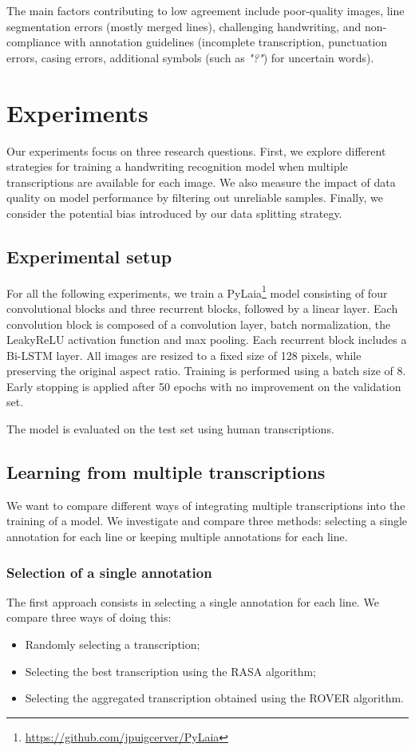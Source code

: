 \documentclass[sigconf]{acmart}
\begin{document}
The main factors contributing to low agreement include poor-quality images, line segmentation errors (mostly merged lines), challenging handwriting, and non-compliance with annotation guidelines (incomplete transcription, punctuation errors, casing errors, additional symbols (such as \textit{"?"}) for uncertain words).  

\section{Experiments}
\label{sec:experiments}

Our experiments focus on three research questions. 
First, we explore different strategies for training a handwriting recognition model when multiple transcriptions are available for each image.
We also measure the impact of data quality on model performance by filtering out unreliable samples. 
Finally, we consider the potential bias introduced by our data splitting strategy. 

\subsection{Experimental setup}

For all the following experiments, we train a PyLaia\footnote{\url{https://github.com/jpuigcerver/PyLaia}} \cite{PyLaia} model consisting of four convolutional blocks and three recurrent blocks, followed by a linear layer. 
Each convolution block is composed of a convolution layer, batch normalization, the LeakyReLU activation function and max pooling. Each recurrent block includes a Bi-LSTM layer.
All images are resized to a fixed size of 128 pixels, while preserving the original aspect ratio. Training is performed using a batch size of 8. 
Early stopping is applied after 50 epochs with no improvement on the validation set.

The model is evaluated on the test set using human transcriptions. 

\subsection{Learning from multiple transcriptions}

We want to compare different ways of integrating multiple transcriptions into the training of a model. We investigate and compare three methods: selecting a single annotation for each line or keeping multiple annotations for each line.

\subsubsection{Selection of a single annotation}
The first approach consists in selecting a single annotation for each line. We compare three ways of doing this: 
\begin{itemize}
    \item Randomly selecting a transcription;
    \item Selecting the best transcription using the RASA algorithm; \item Selecting the aggregated transcription obtained using the ROVER algorithm. \end{itemize}
\end{document}
